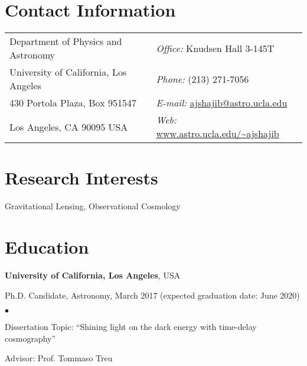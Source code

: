 \documentclass[margin, line]{res}
\newenvironment{list1}{
  \begin{list}{\ding{113}}{%
      \setlength{\itemsep}{0in}
      \setlength{\parsep}{0in} \setlength{\parskip}{0in}
      \setlength{\topsep}{0in} \setlength{\partopsep}{0in} 
      \setlength{\leftmargin}{0.17in}}}{\end{list}}
\newenvironment{list2}{
  \begin{list}{$\bullet$}{%
      \setlength{\itemsep}{0in}
      \setlength{\parsep}{0in} \setlength{\parskip}{0in}
      \setlength{\topsep}{0in} \setlength{\partopsep}{0in} 
      \setlength{\leftmargin}{0.2in}}}{\end{list}}
\begin{document}

\begin{resume}
\section{\sc Contact Information}
\vspace{.05in}
\begin{tabular}{@{}p{3in}p{3in}}                  
Department of Physics and Astronomy    & {\it Office:} Knudsen Hall 3-145T   \\     
University of California, Los Angeles  & {\it Phone:}  (213) 271-7056 \\     
430 Portola Plaza, Box 951547 				         & {\it E-mail:}  \href{mailto:ajshajib@astro.ucla.edu}{ajshajib@astro.ucla.edu} \\
Los Angeles, CA 90095 USA  & {\it Web:} \url{www.astro.ucla.edu/~ajshajib} \\   
\end{tabular}


\section{\sc Research Interests}
Gravitational Lensing, Observational Cosmology

\section{\sc Education}
{\bf University of California, Los Angeles}, USA\\
\vspace*{-.1in}
\begin{list1}
	\item[] Ph.D. Candidate, Astronomy, March 2017 (expected
  	graduation date: June 2020)
	\begin{list2}
		\vspace*{.05in}
		\item Dissertation Topic:  ``Shining light on the dark energy with time-delay cosmography'' 
		\item Advisor:  Prof. Tommaso Treu
	\end{list2}
\end{list1}
\vspace*{.05in}


\end{resume}
\end{document}
